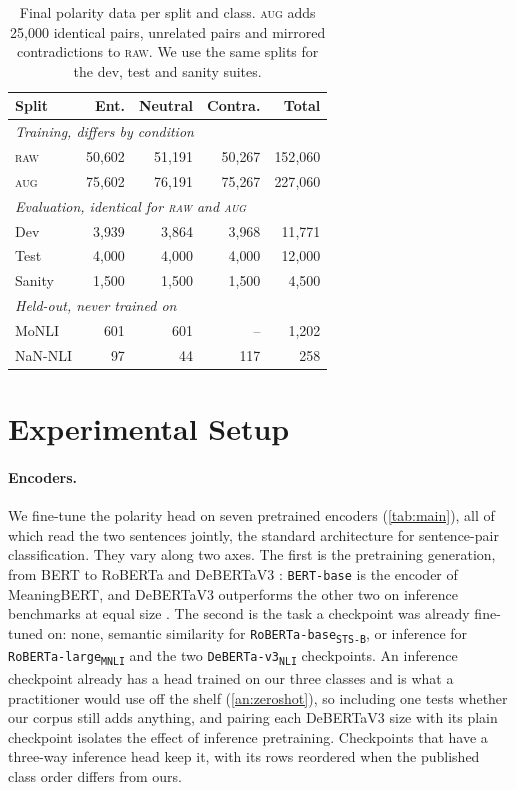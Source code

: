 \documentclass[11pt]{article}
\begin{document}
\begin{table}[t]
\centering\small
\begin{tabular}{l rrrr}
\toprule
Split & Ent. & Neutral & Contra. & Total \\
\midrule
\multicolumn{5}{l}{\emph{Training, differs by condition}} \\
\textsc{raw} & 50{,}602 & 51{,}191 & 50{,}267 & 152{,}060 \\
\textsc{aug} & 75{,}602 & 76{,}191 & 75{,}267 & 227{,}060 \\
\multicolumn{5}{l}{\emph{Evaluation, identical for \textup{\textsc{raw}} and \textup{\textsc{aug}}}} \\
Dev & 3{,}939 & 3{,}864 & 3{,}968 & 11{,}771 \\
Test & 4{,}000 & 4{,}000 & 4{,}000 & 12{,}000 \\
Sanity & 1{,}500 & 1{,}500 & 1{,}500 & 4{,}500 \\
\multicolumn{5}{l}{\emph{Held-out, never trained on}} \\
MoNLI & 601 & 601 & -- & 1{,}202 \\
NaN-NLI & 97 & 44 & 117 & 258 \\
\bottomrule
\end{tabular}
\caption{Final polarity data per split and class. \textsc{aug} adds 25{,}000 identical pairs, unrelated pairs and mirrored contradictions to \textsc{raw}. We use the same splits for the dev, test and sanity suites.}
\label{tab:final}
\end{table}

\section{Experimental Setup}
\label{sec:setup}

\paragraph{Encoders.}
We fine-tune the polarity head on seven pretrained encoders (\autoref{tab:main}), all of which read the two sentences jointly, the standard architecture for sentence-pair classification.
They vary along two axes.
The first is the pretraining generation, from BERT \citep{devlin2019bert} to RoBERTa \citep{liu2019roberta} and DeBERTaV3 \citep{he2023debertav3}: \texttt{BERT-base} is the encoder of MeaningBERT, and DeBERTaV3 outperforms the other two on inference benchmarks at equal size \citep{he2023debertav3}.
The second is the task a checkpoint was already fine-tuned on: none, semantic similarity for \texttt{RoBERTa-base\textsubscript{STS-B}}, or inference for \texttt{RoBERTa-large\textsubscript{MNLI}} and the two \texttt{DeBERTa-v3\textsubscript{NLI}} checkpoints.
An inference checkpoint already has a head trained on our three classes and is what a practitioner would use off the shelf (\autoref{an:zeroshot}), so including one tests whether our corpus still adds anything, and pairing each DeBERTaV3 size with its plain checkpoint isolates the effect of inference pretraining.
Checkpoints that have a three-way inference head keep it, with its rows reordered when the published class order differs from ours.
\end{document}
